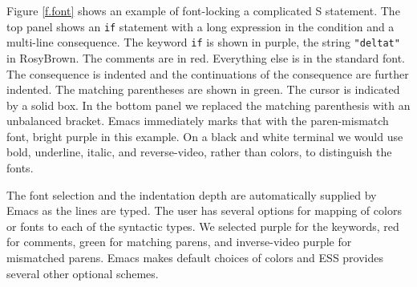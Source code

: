 \documentclass{article}
\newcommand{\stexttt}[1]{{\small\texttt{#1}}}
\begin{document}
Figure \ref{f.font} shows an example of font-locking a complicated S
statement.  The top panel shows an \stexttt{if} statement with a long
expression in the condition and a multi-line consequence.  The keyword
\stexttt{if} is shown in purple, the string \stexttt{"deltat"} in
RosyBrown.  The comments are in red.  Everything else is in the
standard font.  The consequence is indented and the continuations of
the consequence are further indented.  The matching parentheses are
shown in green.  The cursor is indicated by a solid box.  In the
bottom panel we replaced the matching parenthesis with an unbalanced
bracket.  Emacs immediately marks that with the paren-mismatch font,
bright purple in this example.  On a black and white terminal we would
use bold, underline, italic, and reverse-video, rather than colors, to
distinguish the fonts.


The font selection and the indentation depth are automatically
supplied by Emacs as the lines are typed.  The user has several
options for mapping of colors or fonts to each of the syntactic types.
We selected
purple for the keywords, red for comments, green for matching parens,
and inverse-video purple for mismatched parens.  Emacs makes default
choices of colors and ESS provides several other optional schemes.
\end{document}
